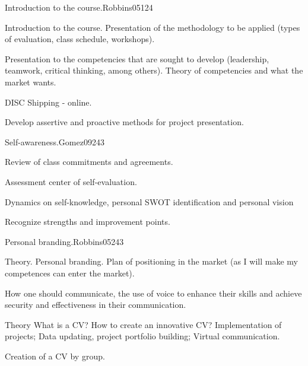 \begin{syllabus}
\begin{unit}{Introduction to the course.}{}{Robbins05}{12}{4}
   \begin{topics}
      \item Introduction to the course. Presentation of the methodology to be applied (types of evaluation, class schedule, workshops).
      \item Presentation to the competencies that are sought to develop (leadership, teamwork, critical thinking, among others). Theory of competencies and what the market wants.
      \item DISC Shipping - online.
   \end{topics}
   \begin{learningoutcomes}
      \item Develop assertive and proactive methods for project presentation.
   \end{learningoutcomes}
\end{unit}

\begin{unit}{Self-awareness.}{}{Gomez09}{24}{3}
   \begin{topics}
      \item Review of class commitments and agreements.
      \item Assessment center of self-evaluation.
      \item Dynamics on self-knowledge, personal SWOT identification and personal vision
   \end{topics}

   \begin{learningoutcomes}
      \item Recognize strengths and improvement points.
      \end{learningoutcomes}
\end{unit}

\begin{unit}{Personal branding.}{}{Robbins05}{24}{3}
   \begin{topics}
      \item Theory. Personal branding. Plan of positioning in the market (as I will make my competences can enter the market).
      \item How one should communicate, the use of voice to enhance their skills and achieve security and effectiveness in their communication.
      \item Theory What is a CV? How to create an innovative CV? Implementation of projects; Data updating, project portfolio building; Virtual communication.
      \item Creation of a CV by group.
   \end{topics}


\end{unit}
\end{syllabus}
